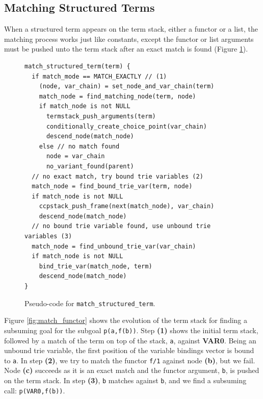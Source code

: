 \subsection{Matching Structured Terms}

When a structured term appears on the term stack, either a functor or a list, the matching process works
just like constants, except the functor or list arguments must be pushed unto the term stack after an exact
match is found (Figure \ref{fig:match_structured_term}).

\begin{figure}[ht]
\begin{Verbatim}
match_structured_term(term) {
  if match_mode == MATCH_EXACTLY // (1)
    (node, var_chain) = set_node_and_var_chain(term)
    match_node = find_matching_node(term, node)
    if match_node is not NULL
      termstack_push_arguments(term)
      conditionally_create_choice_point(var_chain)
      descend_node(match_node)
    else // no match found
      node = var_chain
      no_variant_found(parent)
  // no exact match, try bound trie variables (2)
  match_node = find_bound_trie_var(term, node)
  if match_node is not NULL
    ccpstack_push_frame(next(match_node), var_chain)
    descend_node(match_node)
  // no bound trie variable found, use unbound trie variables (3)
  match_node = find_unbound_trie_var(var_chain)
  if match_node is not NULL
    bind_trie_var(match_node, term)
    descend_node(match_node)
}
\end{Verbatim}
\caption{Pseudo-code for \texttt{match\_structured\_term}.}
\label{fig:match_structured_term}
\end{figure}

Figure \ref{fig:match_functor} shows the evolution of the term stack for finding
a subsuming goal for the subgoal \texttt{p(a,f(b))}. Step \textbf{(1)} shows the initial 
term stack, followed by a match of the term on top of the stack, \texttt{a}, against \textbf{VAR0}.
Being an unbound trie variable, the first position of the variable bindings vector is
bound to \texttt{a}.
In step \textbf{(2)}, we try to match the functor \texttt{f/1} against node \textbf{(b)}, but we fail.
Node \textbf{(c)} succeeds as it is an exact match and the functor argument, \texttt{b}, is pushed on
the term stack. In step \textbf{(3)}, \texttt{b} matches against \texttt{b}, and we find a subsuming call:
\texttt{p(VAR0,f(b))}.

